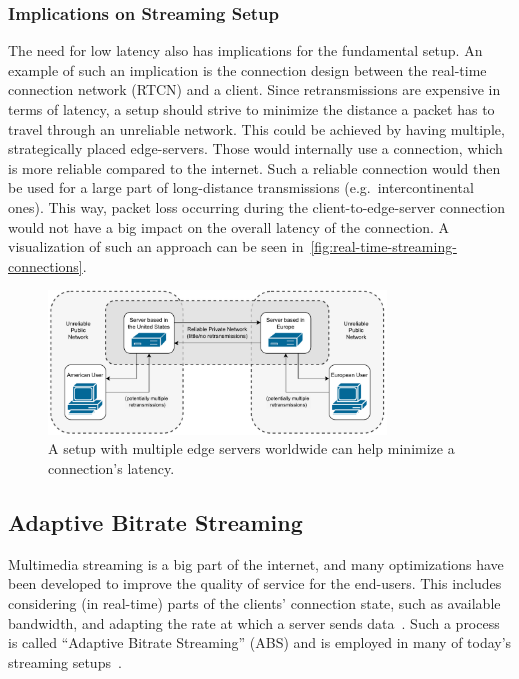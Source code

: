 \subsubsection{Implications on Streaming Setup}
The need for low latency also has implications for the fundamental setup.
An example of such an implication is the connection design between the 
real-time connection network (RTCN) and a client.
Since retransmissions are expensive in terms of latency, a setup should strive to minimize 
the distance a packet has to travel through an unreliable network.
This could be achieved by having multiple, strategically placed edge-servers.
Those would internally use a connection, which is more reliable compared to the internet.
Such a reliable connection would then be used for a large part of long-distance transmissions
(e.g.~intercontinental ones).
This way, packet loss occurring during the client-to-edge-server connection would not have a big 
impact on the overall latency of the connection.
A visualization of such an approach can be seen in~\autoref{fig:real-time-streaming-connections}.

\vspace{0.5cm}
\begin{figure}[H]
    \centering
    \includegraphics[width=0.8\textwidth]{figures/02_background/real-time-streaming-connections.drawio.pdf}
    \caption[Real-time streaming connections]{A setup with multiple edge servers worldwide can help minimize a connection's latency.}\label{fig:real-time-streaming-connections}
\end{figure}

\subsection{Adaptive Bitrate Streaming}\label{subsec:adaptive_bitrate_streaming}
Multimedia streaming is a big part of the internet, and many optimizations have
been developed to improve the quality of service for the end-users.
This includes considering (in real-time) parts of the clients' connection state, 
such as available bandwidth, and adapting the rate at which a server sends 
data~\parencite{cloudflare-what-is-adaptive-bitrate-streaming,imagekit-adaptive-bitrate-streaming}.
Such a process is called ``Adaptive Bitrate Streaming'' (ABS) and is employed in many 
of today's streaming setups~\parencite{netflix-optimizing-stream-experience}.

